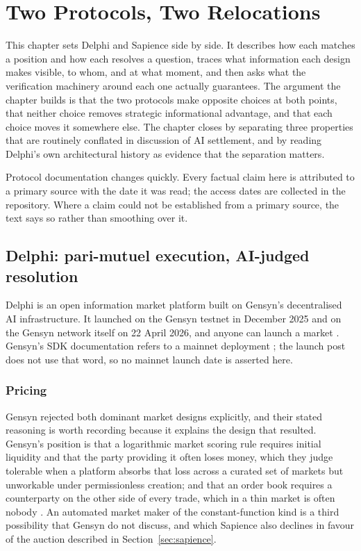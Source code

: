 \chapter{Two Protocols, Two Relocations}
\label{ch:protocols}

This chapter sets Delphi and Sapience side by side. It describes how each matches a
position and how each resolves a question, traces what information each design makes
visible, to whom, and at what moment, and then asks what the verification machinery around
each one actually guarantees. The argument the chapter builds is that the two protocols
make opposite choices at both points, that neither choice removes strategic informational
advantage, and that each choice moves it somewhere else. The chapter closes by separating
three properties that are routinely conflated in discussion of AI settlement, and by
reading Delphi's own architectural history as evidence that the separation matters.

Protocol documentation changes quickly. Every factual claim here is attributed to a primary
source with the date it was read; the access dates are collected in the repository. Where a
claim could not be established from a primary source, the text says so rather than
smoothing over it.

\section{Delphi: pari-mutuel execution, AI-judged resolution}
\label{sec:delphi}

Delphi is an open information market platform built on Gensyn's decentralised AI
infrastructure. It launched on the Gensyn testnet in December 2025 and on the Gensyn network
itself on 22 April 2026, and anyone can launch a market \cite{gensyn2026delphilaunch}.
Gensyn's SDK documentation refers to a mainnet deployment \cite{gensyn2026sdk}; the launch
post does not use that word, so no mainnet launch date is asserted here.

\subsection{Pricing}

Gensyn rejected both dominant market designs explicitly, and their stated reasoning is
worth recording because it explains the design that resulted. Gensyn's position is that a
logarithmic market scoring rule \cite{hanson2007lmsr} requires initial liquidity and that
the party providing it often loses money, which they judge tolerable when a platform
absorbs that loss across a curated set of markets but unworkable under permissionless
creation; and that an order book requires a counterparty on the other side of every trade,
which in a thin market is often nobody \cite{gensyn2026delphi}. An automated market maker
of the constant-function kind is a third possibility that Gensyn do not discuss, and which
Sapience also declines in favour of the auction described in
Section~\ref{sec:sapience}.

